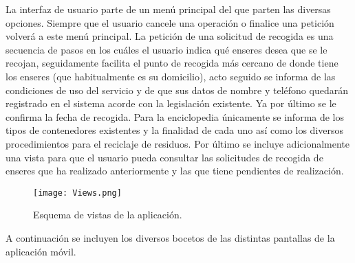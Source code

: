 
La interfaz de usuario parte de un menú principal del que parten las diversas opciones. Siempre que el usuario cancele una operación o finalice una petición volverá a este menú principal.
La petición de una solicitud de recogida es una secuencia de pasos en los cuáles el usuario indica qué enseres desea que se le recojan, seguidamente facilita el punto de recogida más cercano de donde tiene los enseres (que habitualmente es su domicilio), acto seguido se informa de las condiciones de uso del servicio y de que sus datos de nombre y teléfono quedarán registrado en el sistema acorde con la legislación existente. Ya por último se le confirma la fecha de recogida. Para la enciclopedia únicamente se informa de los tipos de contenedores existentes y la finalidad de cada uno así como los diversos procedimientos para el reciclaje de residuos. Por último se incluye adicionalmente una vista para que el usuario pueda consultar las solicitudes de recogida de enseres que ha realizado anteriormente y las que tiene pendientes de realización. 
\begin{figure}[H]
\centering
	\texttt{[image: Views.png]} 
\caption{Esquema de vistas de la aplicación.}
\end{figure}	

A continuación se incluyen los diversos bocetos de las distintas pantallas de la aplicación móvil. 

